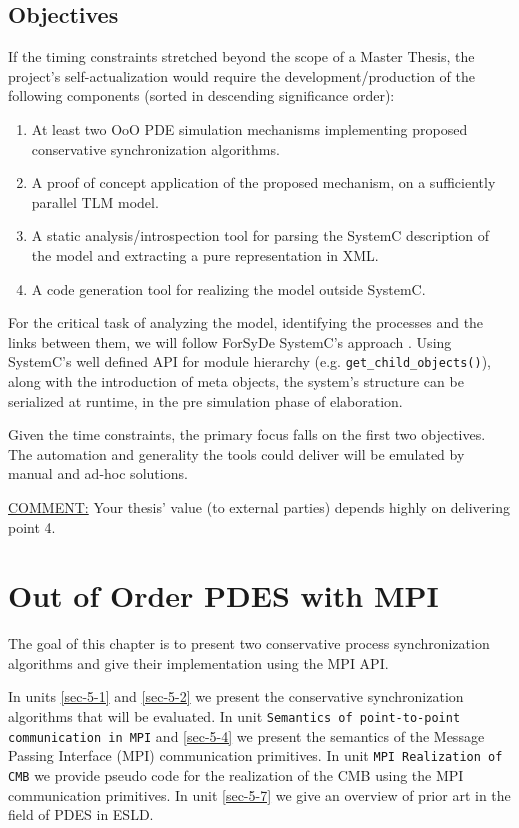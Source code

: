 \documentclass[12pt,twoside]{article}
\begin{document}
\subsection{Objectives}
\label{sec-4-7}
If the timing constraints stretched beyond the scope of a Master Thesis, 
the project's self-actualization would require the development/production of the following components (sorted in descending significance order):
\begin{enumerate}
\item At least two OoO PDE simulation mechanisms implementing proposed conservative synchronization algorithms.
\item A proof of concept application of the proposed mechanism, on a sufficiently parallel TLM model.
\item A static analysis/introspection tool for parsing the SystemC description of the model and extracting a pure representation in XML.
\item A code generation tool for realizing the model outside SystemC.
\end{enumerate}
For the critical task of analyzing the model, identifying the processes and the links between them, we will follow ForSyDe SystemC's approach \cite{Hosein2012}.
Using SystemC's well defined API for module hierarchy (e.g. \texttt{get\_child\_objects()}), along with the introduction of meta objects, the system's structure can be
serialized at runtime, in the pre simulation phase of elaboration.

Given the time constraints, the primary focus falls on the first two objectives.
The automation and generality the tools could deliver will be emulated by manual and ad-hoc solutions.

\uline{COMMENT:} Your thesis' value (to external parties) depends highly on delivering point 4.

\clearpage


\section{Out of Order PDES with MPI}
\label{sec-5}
The goal of this chapter is to present two conservative process synchronization algorithms and give their implementation using the MPI API.

In units \ref{sec-5-1} and \ref{sec-5-2} we present the conservative synchronization algorithms that will be evaluated.
In unit \texttt{Semantics of point-to-point communication in MPI} and \ref{sec-5-4} we present the semantics of the Message Passing Interface (MPI) communication primitives.
In unit \texttt{MPI Realization of CMB} we provide pseudo code for the realization of the CMB using the MPI communication primitives.
In unit \ref{sec-5-7} we give an overview of prior art in the field of PDES in ESLD.
\end{document}
